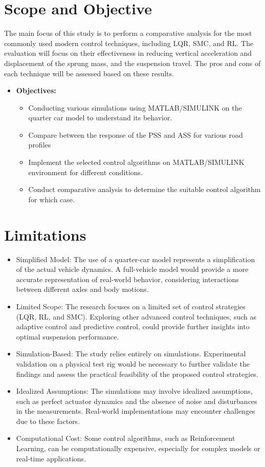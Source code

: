 \section{Scope and Objective}
The main focus of this study is to perform a comparative analysis for the most commonly used modern control techniques, including LQR, SMC, and RL. The evaluation will focus on their effectiveness in reducing vertical acceleration and displacement of the sprung mass, and the suspension travel. The pros and cons of each technique will be assessed based on these results.
	
\begin{itemize}
	\item \textbf{Objectives:}
	\begin{itemize}
		\item Conducting various simulations using MATLAB/SIMULINK on the quarter car model to understand its behavior.
		\item Compare between the response of the PSS and ASS for various road profiles
		\item Implement the selected control algorithms on MATLAB/SIMULINK environment for different conditions.
		\item Conduct comparative analysis to determine the suitable control algorithm for which case.
		
	\end{itemize}
\end{itemize}	

\section{Limitations}
\begin{itemize}
\item Simplified Model: The use of a quarter-car model represents a simplification of the actual vehicle dynamics. A full-vehicle model would provide a more accurate representation of real-world behavior, considering interactions between different axles and body motions.
\item Limited Scope: The research focuses on a limited set of control strategies (LQR, RL, and SMC). Exploring other advanced control techniques, such as adaptive control and predictive control, could provide further insights into optimal suspension performance.
\item Simulation-Based: The study relies entirely on simulations. Experimental validation on a physical test rig would be necessary to further validate the findings and assess the practical feasibility of the proposed control strategies.
\item Idealized Assumptions: The simulations may involve idealized assumptions, such as perfect actuator dynamics and the absence of noise and disturbances in the measurements. Real-world implementations may encounter challenges due to these factors.
\item Computational Cost: Some control algorithms, such as Reinforcement Learning, can be computationally expensive, especially for complex models or real-time applications.
\end{itemize}

